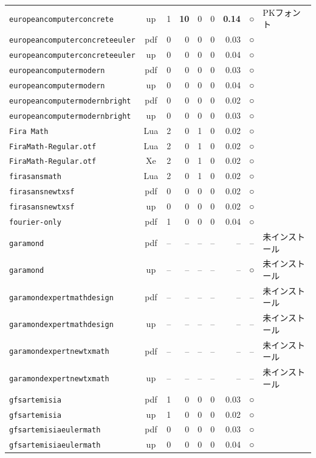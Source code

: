 \begin{longtable}{@{}lcrrrrrcl@{}}
\texttt{europeancomputerconcrete} & up & 1 & \textbf{10} & 0 & 0 & \textbf{0.14} & ○ & PKフォント\\
\texttt{europeancomputerconcreteeuler} & pdf & 0 & 0 & 0 & 0 & 0.03 & ○ & \\
\texttt{europeancomputerconcreteeuler} & up & 0 & 0 & 0 & 0 & 0.04 & ○ & \\
\texttt{europeancomputermodern} & pdf & 0 & 0 & 0 & 0 & 0.03 & ○ & \\
\texttt{europeancomputermodern} & up & 0 & 0 & 0 & 0 & 0.04 & ○ & \\
\texttt{europeancomputermodernbright} & pdf & 0 & 0 & 0 & 0 & 0.02 & ○ & \\
\texttt{europeancomputermodernbright} & up & 0 & 0 & 0 & 0 & 0.03 & ○ & \\
\texttt{Fira Math} & Lua & 2 & 0 & 1 & 0 & 0.02 & ○ & \\
\texttt{FiraMath-Regular.otf} & Lua & 2 & 0 & 1 & 0 & 0.02 & ○ & \\
\texttt{FiraMath-Regular.otf} & Xe & 2 & 0 & 1 & 0 & 0.02 & ○ & \\
\texttt{firasansmath} & Lua & 2 & 0 & 1 & 0 & 0.02 & ○ & \\
\texttt{firasansnewtxsf} & pdf & 0 & 0 & 0 & 0 & 0.02 & ○ & \\
\texttt{firasansnewtxsf} & up & 0 & 0 & 0 & 0 & 0.02 & ○ & \\
\texttt{fourier-only} & pdf & 1 & 0 & 0 & 0 & 0.04 & ○ & \\
\texttt{garamond} & pdf & -- & -- & -- & -- & -- & -- & 未インストール\\
\texttt{garamond} & up & -- & -- & -- & -- & -- & ○ & 未インストール\\
\texttt{garamondexpertmathdesign} & pdf & -- & -- & -- & -- & -- & -- & 未インストール\\
\texttt{garamondexpertmathdesign} & up & -- & -- & -- & -- & -- & -- & 未インストール\\
\texttt{garamondexpertnewtxmath} & pdf & -- & -- & -- & -- & -- & -- & 未インストール\\
\texttt{garamondexpertnewtxmath} & up & -- & -- & -- & -- & -- & -- & 未インストール\\
\texttt{gfsartemisia} & pdf & 1 & 0 & 0 & 0 & 0.03 & ○ & \\
\texttt{gfsartemisia} & up & 1 & 0 & 0 & 0 & 0.02 & ○ & \\
\texttt{gfsartemisiaeulermath} & pdf & 0 & 0 & 0 & 0 & 0.03 & ○ & \\
\texttt{gfsartemisiaeulermath} & up & 0 & 0 & 0 & 0 & 0.04 & ○ & \\

\end{longtable}

